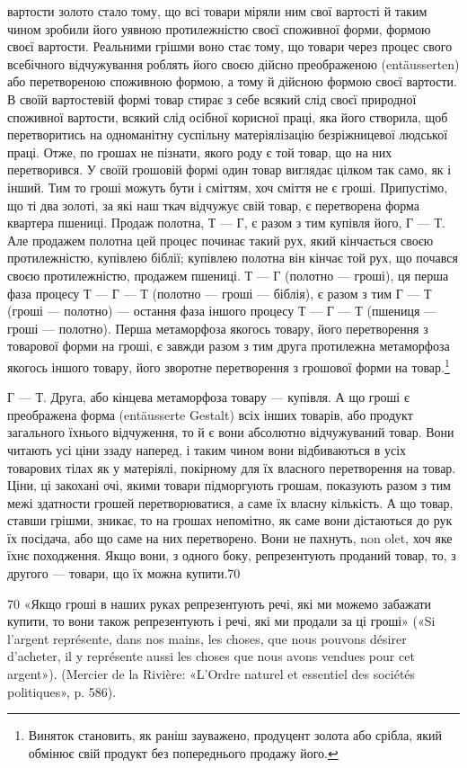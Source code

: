 вартости золото стало тому, що всі товари міряли ним свої вартості
й таким чином зробили його уявною протилежністю своєї
споживної форми, формою своєї вартости. Реальними грішми
воно стає тому, що товари через процес свого всебічного відчужування
роблять його своєю дійсно преображеною (entäusserten)
або перетвореною споживною формою, а тому й дійсною формою
своєї вартости. В своїй вартостевій формі товар стирає з себе
всякий слід своєї природної споживної вартости, всякий слід
осібної корисної праці, яка його створила, щоб перетворитись
на одноманітну суспільну матеріялізацію безріжницевої людської
праці. Отже, по грошах не пізнати, якого роду є той товар,
що на них перетворився. У своїй грошовій формі один товар
виглядає цілком так само, як і інший. Тим то гроші можуть бути
і сміттям, хоч сміття не є гроші. Припустімо, що ті два золоті,
за які наш ткач відчужує свій товар, є перетворена форма квартера
пшениці. Продаж полотна, Т — Г, є разом з тим купівля
його, Г — Т. Але продажем полотна цей процес починає такий
рух, який кінчається своєю протилежністю, купівлею біблії;
купівлею полотна він кінчає той рух, що почався своєю протилежністю,
продажем пшениці. Т — Г (полотно — гроші), ця перша
фаза процесу Т — Г — Т (полотно — гроші — біблія), є разом
з тим Г — Т (гроші — полотно) — остання фаза іншого процесу
Т — Г — Т (пшениця — гроші — полотно). Перша метаморфоза
якогось товару, його перетворення з товарової форми на гроші,
є завжди разом з тим друга протилежна метаморфоза якогось
іншого товару, його зворотне перетворення з грошової форми на
товар.\footnote{
Виняток становить, як раніш зауважено, продуцент золота або
срібла, який обмінює свій продукт без попереднього продажу його.
}

Г — Т. Друга, або кінцева метаморфоза товару — купівля.
А що гроші є преображена форма (entäusserte Gestalt) всіх інших
товарів, або продукт загального їхнього відчуження, то й є вони
абсолютно відчужуваний товар. Вони читають усі ціни ззаду
наперед, і таким чином вони відбиваються в усіх товарових тілах
як у матеріялі, покірному для їх власного перетворення на товар.
Ціни, ці закохані очі, якими товари підморгують грошам, показують
разом з тим межі здатности грошей перетворюватися, а
саме їх власну кількість. А що товар, ставши грішми, зникає,
то на грошах непомітно, як саме вони дістаються до рук їх посідача,
або що саме на них перетворено. Вони не пахнуть, non olet,
хоч яке їхнє походження. Якщо вони, з одного боку, репрезентують
проданий товар, то, з другого — товари, що їх можна
купити.70

70  «Якщо гроші в наших руках репрезентують речі, які ми можемо
забажати купити, то вони також репрезентують і речі, які ми продали за
ці гроші» («Si l’argent représente, dans nos mains, les choses, que nous
pouvons désirer d’acheter, il y représente aussi les choses que nous avons
vendues pour cet argent»). (Mercier de la Rivière: «L’Ordre naturel et
essentiel des sociétés politiques», p. 586).
